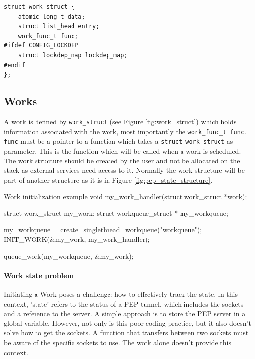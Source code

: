 \documentclass[a4paper,english, 11pt]{report}
\begin{document}
\noindent\begin{minipage}{\linewidth}
\begin{verbatim}
struct work_struct {
    atomic_long_t data;
    struct list_head entry;
    work_func_t func;
#ifdef CONFIG_LOCKDEP
    struct lockdep_map lockdep_map;
#endif
};
\end{verbatim}
\label{fig:work_struct}
\end{minipage}

\subsection{Works}
A work is defined by \verb|work_struct| (see Figure \ref{fig:work_struct}) which holds information associated with the work, most importantly the \verb|work_func_t func|. \verb|func| must be a pointer to a function which takes a \verb|struct work_struct| as parameter. This is the function which will be called when a work is scheduled. The work structure should be created by the user and not be allocated on the stack as external services need access to it. Normally the work structure will be part of another structure as it is in Figure \ref{fig:pep_state_structure}.\\


\begin{autonumlstlisting}[label=lst:work_init]{Work initialization example}
void my_work_handler(struct work_struct *work);

struct work_struct my_work;
struct workqueue_struct * my_workqueue;

my_workqueue = create_singlethread_workqueue("workqueue");
INIT_WORK(&my_work, my_work_handler);

queue_work(my_workqueue, &my_work);
\end{autonumlstlisting}

\paragraph{Work state problem}
Initiating a Work poses a challenge: how to effectively track the state. In this context, 'state' refers to the status of a PEP tunnel, which includes the sockets and a reference to the server. A simple approach is to store the PEP server in a global variable. However, not only is this poor coding practice, but it also doesn't solve how to get the sockets. A function that transfers between two sockets must be aware of the specific sockets to use. The work alone doesn't provide this context.\\
\end{document}
